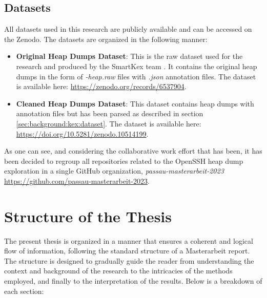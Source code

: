 	\subsection{Datasets}

	All datasets used in this research are publicly available and can be accessed on the Zenodo. The datasets are organized in the following manner:

	\begin{itemize}
		\item \textbf{Original Heap Dumps Dataset}: This is the raw dataset used for the research and produced by the SmartKex team \cite{SSHkex22}. It contains the original heap dumps in the form of \textit{-heap.raw} files with \textit{.json} annotation files. The dataset is available here: \url{https://zenodo.org/records/6537904}.
		\item \textbf{Cleaned Heap Dumps Dataset}: This dataset contains heap dumps with annotation files but has been parsed as described in section \ref{sec:background:kex:dataset}. The dataset is available here: \url{https://doi.org/10.5281/zenodo.10514199}.
	\end{itemize}

	As one can see, and considering the collaborative work effort that has been, it has been decided to regroup all repositories related to the OpenSSH heap dump exploration in a single GitHub organization, \textit{passau-masterarbeit-2023} \url{https://github.com/passau-masterarbeit-2023}.

	\section{Structure of the Thesis}


	The present thesis is organized in a manner that ensures a coherent and logical flow of information, following the standard structure of a Masterarbeit report. The structure is designed to gradually guide the reader from understanding the context and background of the research to the intricacies of the methods employed, and finally to the interpretation of the results. Below is a breakdown of each section:
	
